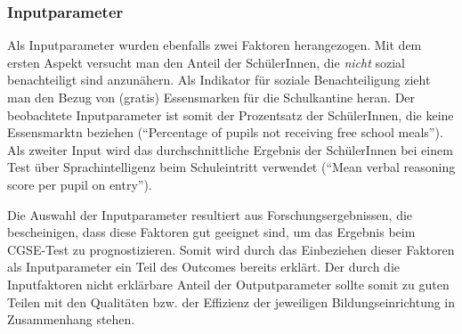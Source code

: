 \subsubsection{Inputparameter}
Als Inputparameter wurden ebenfalls zwei Faktoren herangezogen.
Mit dem ersten Aspekt versucht man den Anteil der SchülerInnen, die \emph{nicht} sozial benachteiligt sind anzunähern.
Als Indikator für soziale Benachteiligung zieht man den Bezug von (gratis) Essensmarken für die Schulkantine heran. Der beobachtete Inputparameter ist somit der Prozentsatz der SchülerInnen, die keine Essensmarktn beziehen ("`Percentage of pupils not receiving free school meals"').
Als zweiter Input wird das durchschnittliche Ergebnis der SchülerInnen bei einem Test über Sprachintelligenz beim Schuleintritt verwendet ("`Mean verbal reasoning score per pupil on entry"').

Die Auswahl der Inputparameter resultiert aus Forschungsergebnissen, die bescheinigen, dass diese Faktoren gut geeignet sind, um das Ergebnis beim CGSE-Test zu prognostizieren.
Somit wird durch das Einbeziehen dieser Faktoren als Inputparameter ein Teil des Outcomes bereits erklärt.
Der durch die Inputfaktoren nicht erklärbare Anteil der Outputparameter sollte somit zu guten Teilen mit den Qualitäten bzw. der Effizienz der jeweiligen Bildungseinrichtung in Zusammenhang stehen.